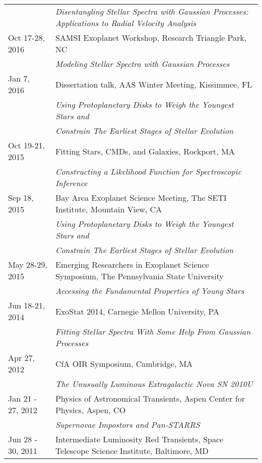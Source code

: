 \documentclass[10pt]{article}
\newcommand{\rowskip}{1.2mm}
\begin{document}
\begin{tabular*}{\textwidth}{@{\hspace{10pt}}p{1.2in}l}
  & \emph{Disentangling Stellar Spectra with Gaussian Processes: Applications to Radial Velocity Analysis} \\[\rowskip]
  Oct 17-28, 2016 & SAMSI Exoplanet Workshop, Research Triangle Park, NC\\
  & \emph{Modeling Stellar Spectra with Gaussian Processes} \\[\rowskip]
  Jan 7, 2016 & Dissertation talk, AAS Winter Meeting, Kissimmee, FL \\
  & \emph{Using Protoplanetary Disks to Weigh the Youngest Stars and} \\
  & \emph{Constrain The Earliest Stages of Stellar Evolution} \\[\rowskip]
  Oct 19-21, 2015 & Fitting Stars, CMDs, and Galaxies, Rockport, MA \\
  & \emph{Constructing a Likelihood Function for Spectroscopic Inference}\\[\rowskip]
  Sep 18, 2015 & Bay Area Exoplanet Science Meeting, The SETI Institute, Mountain View, CA \\
  & \emph{Using Protoplanetary Disks to Weigh the Youngest Stars and} \\
  & \emph{Constrain The Earliest Stages of Stellar Evolution} \\[\rowskip]
  May 28-29, 2015 & Emerging Researchers in Exoplanet Science Symposium, The Pennsylvania State University\\
  & \emph{Accessing the Fundamental Properties of Young Stars} \\[\rowskip]
  Jun 18-21, 2014 & ExoStat 2014, Carnegie Mellon University, PA \\
  & \emph{Fitting Stellar Spectra With Some Help From Gaussian Processes} \\[\rowskip]
  Apr 27, 2012 & CfA OIR Symposium, Cambridge, MA \\
  & \emph{The Unusually Luminous Extragalactic Nova SN 2010U}\\
  Jan 21 - 27, 2012 & Physics of Astronomical Transients, Aspen Center for Physics, Aspen, CO \\
  & \emph{Supernovae Impostors and Pan-STARRS} \\[\rowskip]
  Jun 28 - 30, 2011 & Intermediate Luminosity Red Transients, Space Telescope Science Institute, Baltimore, MD\\

\end{tabular*}
\end{document}
